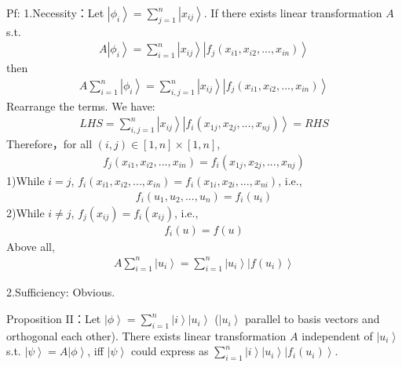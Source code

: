 \documentclass[%
 reprint,
 amsmath,amssymb,
pra,
]{revtex4-1}
\begin{document}
\begin{itemize}
\noindent Pf: 1.Necessity：Let $\left|\phi_i\right\rangle = \sum_{j=1}^n \left|x_{ij}\right\rangle$. If there exists linear transformation $A$ s.t.
\begin{align*}
A\left|\phi_i\right\rangle = \sum_{i=1}^n\left|x_{ij}\right\rangle\left|f_{j}\left(x_{i1}, x_{i2}, ..., x_{in}\right)\right\rangle
\end{align*}
then
\begin{align*}
A\sum_{i=1}^{n}\left|\phi_i\right\rangle = \sum_{i, j=1}^n\left|x_{ij}\right\rangle\left|f_{j}\left(x_{i1}, x_{i2}, ..., x_{in}\right)\right\rangle
\end{align*}
Rearrange the terms. We have: 
\begin{align*}
LHS = \sum_{i, j=1}^n\left|x_{ij}\right\rangle\left|f_{i}\left(x_{1j}, x_{2j}, ..., x_{nj}\right)\right\rangle = RHS
\end{align*}
Therefore，for all $\left(i, j\right) \in \left[1, n\right]\times\left[1, n\right]$, 
\begin{align*}
f_{j}\left(x_{i1}, x_{i2}, ..., x_{in}\right) = f_{i}\left(x_{1j}, x_{2j}, ..., x_{nj}\right)
\end{align*}
1)While $i=j$, $f_{i}\left(x_{i1}, x_{i2}, ..., x_{in}\right) = f_{i}\left(x_{1i}, x_{2i}, ..., x_{ni}\right)$, i.e., 
\begin{align*}
f_i\left(u_1, u_2, ...,u_n\right) = f_i\left(u_i\right)
\end{align*}
2)While $i\neq j$, $f_j\left(x_{ij}\right) = f_i\left(x_{ij}\right)$, i.e., 
\begin{align*}
f_i\left(u\right) = f\left(u\right)
\end{align*}
Above all, 
\begin{align*}
A\sum_{i=1}^{n}\left|u_i\right\rangle = \sum_{i=1}^{n}\left|u_i\right\rangle\left|f\left(u_i\right)\right\rangle
\end{align*}

2.Sufficiency: Obvious.

\noindent Proposition II：Let $\left|\phi\right\rangle = \sum_{i=1}^n \left|i\right\rangle\left|u_i\right\rangle$ ($\left|u_i\right\rangle$ parallel to basis vectors and orthogonal each other). There exists 
linear transformation $A$ independent of $\left|u_{i}\right\rangle$ s.t. $\left|\psi\right\rangle = A\left|\phi\right\rangle$, iff $\left|\psi\right\rangle$ could express as $\sum_{i=1}^n \left|i\right\rangle\left|u_i\right\rangle\left|f_{i}\left(u_i\right)\right\rangle$.


\end{itemize}
\end{document}

